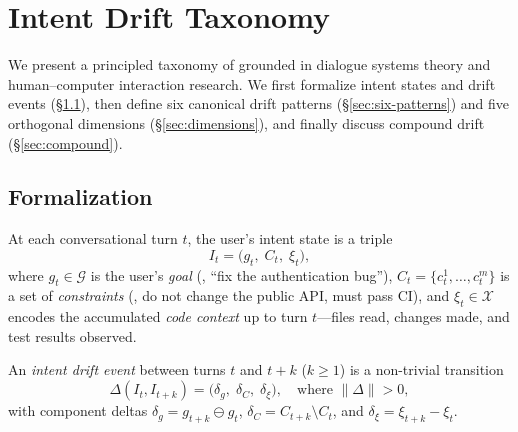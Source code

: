 
\section{Intent Drift Taxonomy}
\label{sec:taxonomy}

We present a principled taxonomy of \drift{} grounded in dialogue systems theory and human--computer interaction research. We first formalize intent states and drift events (\S\ref{sec:formalization}), then define six canonical drift patterns (\S\ref{sec:six-patterns}) and five orthogonal dimensions (\S\ref{sec:dimensions}), and finally discuss compound drift (\S\ref{sec:compound}).

\subsection{Formalization}
\label{sec:formalization}

\begin{definition}
\label{def:intent-state}
At each conversational turn $t$, the user's intent state is a triple
\begin{equation}
    I_t = \bigl(g_t,\; C_t,\; \xi_t\bigr),
    \label{eq:intent-state}
\end{equation}
where $g_t \in \mathcal{G}$ is the user's \emph{goal} (\eg, ``fix the authentication bug''), $C_t = \{c_t^1, \ldots, c_t^m\}$ is a set of \emph{constraints} (\eg, do not change the public API, must pass CI), and $\xi_t \in \mathcal{X}$ encodes the accumulated \emph{code context} up to turn $t$---files read, changes made, and test results observed.
\end{definition}

\begin{definition}
\label{def:drift-event}
An \emph{intent drift event} between turns $t$ and $t{+}k$ ($k \geq 1$) is a non-trivial transition
\begin{equation}
    \Delta(I_t, I_{t+k}) = \bigl(\delta_g,\; \delta_C,\; \delta_\xi\bigr), \quad \text{where } \|\Delta\| > 0,
    \label{eq:drift-event}
\end{equation}
with component deltas $\delta_g = g_{t+k} \ominus g_t$, $\delta_C = C_{t+k} \setminus C_t$, and $\delta_\xi = \xi_{t+k} - \xi_t$.
\end{definition}

